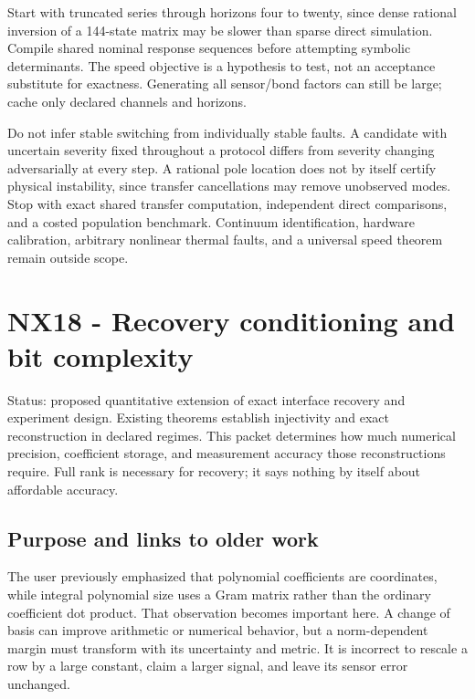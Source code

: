 \documentclass[
  11pt,
  a4paper,
]{report}
\begin{document}
Start with truncated series through horizons four to twenty, since dense
rational inversion of a 144-state matrix may be slower than sparse
direct simulation. Compile shared nominal response sequences before
attempting symbolic determinants. The speed objective is a hypothesis to
test, not an acceptance substitute for exactness. Generating all
sensor/bond factors can still be large; cache only declared channels and
horizons.

Do not infer stable switching from individually stable faults. A
candidate with uncertain severity fixed throughout a protocol differs
from severity changing adversarially at every step. A rational pole
location does not by itself certify physical instability, since transfer
cancellations may remove unobserved modes. Stop with exact shared
transfer computation, independent direct comparisons, and a costed
population benchmark. Continuum identification, hardware calibration,
arbitrary nonlinear thermal faults, and a universal speed theorem remain
outside scope.

\hypertarget{nx18---recovery-conditioning-and-bit-complexity}{%
\chapter{NX18 - Recovery conditioning and bit
complexity}\label{nx18---recovery-conditioning-and-bit-complexity}}

Status: proposed quantitative extension of exact interface recovery and
experiment design. Existing theorems establish injectivity and exact
reconstruction in declared regimes. This packet determines how much
numerical precision, coefficient storage, and measurement accuracy those
reconstructions require. Full rank is necessary for recovery; it says
nothing by itself about affordable accuracy.

\hypertarget{purpose-and-links-to-older-work}{%
\section{Purpose and links to older
work}\label{purpose-and-links-to-older-work}}

The user previously emphasized that polynomial coefficients are
coordinates, while integral polynomial size uses a Gram matrix rather
than the ordinary coefficient dot product. That observation becomes
important here. A change of basis can improve arithmetic or numerical
behavior, but a norm-dependent margin must transform with its
uncertainty and metric. It is incorrect to rescale a row by a large
constant, claim a larger signal, and leave its sensor error unchanged.
\end{document}
